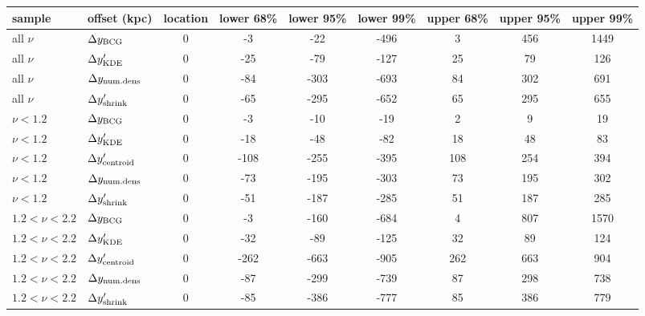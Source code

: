 \begin{tabular}{llccccccc}
\toprule
sample & offset (kpc) &  location &  lower 68\% &  lower 95\% &  lower 99\% &  upper 68\% &  upper 95\% &  upper 99\% \\
\midrule
all $\nu$ & $\Delta y_{\rm BCG}$               &         0 &          -3 &         -22 &        -496 &           3 &         456 &        1449 \\
all $\nu$ & $\Delta y_{\rm KDE}'$              &         0 &         -25 &         -79 &        -127 &          25 &          79 &         126 \\
all $\nu$ & $\Delta y_{\rm num. dens}$         &        0 &         -84 &        -303 &        -693 &          84 &         302 &         691 \\
all $\nu$ & $\Delta y_{\rm shrink}'$           &        0 &         -65 &        -295 &        -652 &          65 &         295 &         655 \\
\midrule
$\nu < 1.2$ & $\Delta y_{\rm BCG}$             &        0 &          -3 &         -10 &         -19 &           2 &           9 &          19 \\
$\nu < 1.2$ & $\Delta y_{\rm KDE}'$            &         0 &         -18 &         -48 &         -82 &          18 &          48 &          83 \\
$\nu < 1.2$ & $\Delta y_{\rm centroid}'$        &        0 &        -108 &        -255 &        -395 &         108 &         254 &         394 \\
$\nu < 1.2$ & $\Delta y_{\rm num. dens}$       &        0 &         -73 &        -195 &        -303 &          73 &         195 &         302 \\
$\nu < 1.2$ & $\Delta y_{\rm shrink}'$         &         0 &         -51 &        -187 &        -285 &          51 &         187 &         285 \\
\midrule
$1.2 < \nu < 2.2$ & $\Delta y_{\rm BCG}$       &         0 &          -3 &        -160 &        -684 &           4 &         807 &        1570 \\
$1.2 < \nu < 2.2$ & $\Delta y_{\rm KDE}'$      &        0 &         -32 &         -89 &        -125 &          32 &          89 &         124 \\
$1.2 < \nu < 2.2$ & $\Delta y_{\rm centroid}'$  &         0 &        -262 &        -663 &        -905 &         262 &         663 &         904 \\
$1.2 < \nu < 2.2$ & $\Delta y_{\rm num. dens}$ &         0 &         -87 &        -299 &        -739 &          87 &         298 &         738 \\
$1.2 < \nu < 2.2$ & $\Delta y_{\rm shrink}'$   &        0 &         -85 &        -386 &        -777 &          85 &         386 &         779 \\
\bottomrule
\end{tabular}
